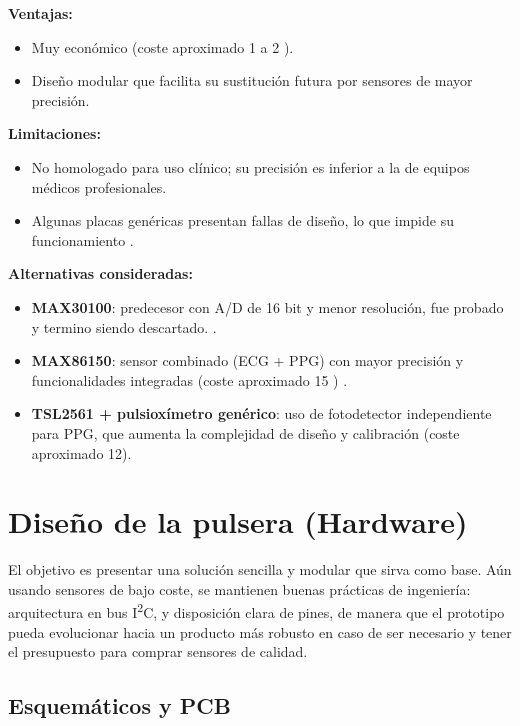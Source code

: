 \documentclass[12pt, a4paper]{article}
\begin{document}
	
	\noindent\textbf{Ventajas:}
	\begin{itemize}
		\item Muy económico (coste aproximado 1 a 2 \texteuro{}).
		\item Diseño modular que facilita su sustitución futura por sensores de mayor precisión.
	\end{itemize}
	
	\noindent\textbf{Limitaciones:}
	\begin{itemize}
		\item No homologado para uso clínico; su precisión es inferior a la de equipos médicos profesionales.  
		\item Algunas placas genéricas presentan fallas de diseño, lo que impide su funcionamiento \cite{LuisLlamas2021}.
	\end{itemize}
	
	\noindent\textbf{Alternativas consideradas:}
	\begin{itemize}
		\item \textbf{MAX30100}: predecesor con A/D de 16 bit y menor resolución, fue probado y termino siendo descartado. \cite{MAX30100Datasheet}.
		\item \textbf{MAX86150}: sensor combinado (ECG + PPG) con mayor precisión y funcionalidades integradas (coste aproximado 15 \texteuro{}) \cite{MAX86150Datasheet}.
		\item \textbf{TSL2561 + pulsioxímetro genérico}: uso de fotodetector independiente para PPG, que aumenta la complejidad de diseño y calibración (coste aproximado 12\texteuro{}).
	\end{itemize}
		
	

\section{Diseño de la pulsera (Hardware)}
	
	El objetivo es presentar una solución sencilla y modular que sirva como base. Aún usando sensores de bajo coste, se mantienen buenas prácticas de ingeniería: arquitectura en bus I\textsuperscript{2}C, y disposición clara de pines, de manera que el prototipo pueda evolucionar hacia un producto más robusto en caso de ser necesario y tener el presupuesto para comprar sensores de calidad.
	
	\subsection{Esquemáticos y PCB}
	
\end{document}
